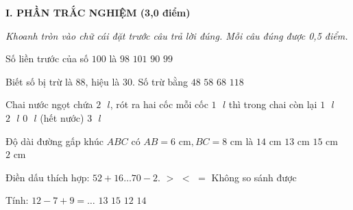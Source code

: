 
\setcounter{ex}{0}
\setcounter{bt}{0}

\textbf{\large I. PHẦN TRẮC NGHIỆM (3,0 điểm)}

{\itshape Khoanh tròn vào chữ cái đặt trước câu trả lời đúng. Mỗi câu đúng được 0,5 điểm.}

\begin{ex} %
Số liền trước của số $100$ là
\choice
{$98$}
{$101$}
{$90$}
{\True $99$}
\end{ex}

\begin{ex} %
Biết số bị trừ là $88$, hiệu là $30$. Số trừ bằng
\choice
{$48$}
{\True $58$}
{$68$}
{$118$}
\end{ex}

\begin{ex} %
Chai nước ngọt chứa $2\text{ }l$, rót ra hai cốc mỗi cốc $1\text{ }l$ thì trong chai còn lại
\choice
{$1\text{ }l$}
{$2\text{ }l$}
{\True $0\text{ }l$ (hết nước)}
{$3\text{ }l$}
\end{ex}

\begin{ex} %
Độ dài đường gấp khúc $ABC$ có $AB = 6\text{ cm}, BC = 8\text{ cm}$ là
\choice
{\True $14\text{ cm}$}
{$13\text{ cm}$}
{$15\text{ cm}$}
{$2\text{ cm}$}
\end{ex}

\begin{ex} %
Điền dấu thích hợp: $52 + 16 \dots 70 - 2$.
\choice
{$>$}
{$<$}
{\True $=$}
{Không so sánh được}
\end{ex}

\begin{ex} %
Tính: $12 - 7 + 9 = \dots$
\choice
{$13$}
{$15$}
{$12$}
{\True $14$}
\end{ex}

